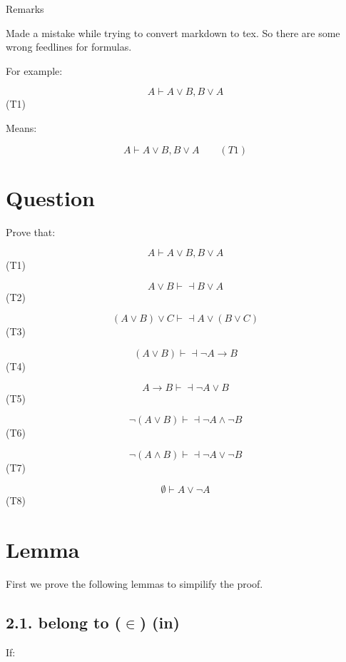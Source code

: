 \documentclass{article} %
\begin{document}
\par

\begin{Huge}
	\begin{center}
		Remarks
	\end{center}
\end{Huge}


Made a mistake while trying to convert markdown to tex. So there are some wrong feedlines for formulas.

For example:

\[A\vdash A \vee B, B \vee A \] (T1)

Means:

\[A\vdash A \vee B, B \vee A \quad \quad(T1)\] 

\newpage

\hypertarget{question}{%
\section{Question}\label{question}}

Prove that:

\[A\vdash A \vee B, B \vee A \] (T1)

\[A\vee B \vdash \dashv B \vee A\] (T2)

\[(A \vee B)\vee C \vdash \dashv A \vee (B \vee C)\] (T3)

\[(A \vee B) \vdash \dashv \neg A \rightarrow B\] (T4)

\[ A \rightarrow B \vdash \dashv \neg A \vee B\] (T5)

\[\neg (A \vee B) \vdash \dashv \neg A \wedge \neg B\] (T6)

\[\neg (A \wedge B) \vdash \dashv \neg A \vee \neg B\] (T7)

\[\emptyset \vdash A \vee \neg A\] (T8)

\hypertarget{lemma}{%
\section{Lemma}\label{lemma}}

First we prove the following lemmas to simpilify the proof.

\hypertarget{belong-to-in-in}{%
\subsection{\texorpdfstring{2.1. belong to (\(\in\))
(in)}{2.1. belong to (\textbackslash{}in) (in)}}\label{belong-to-in-in}}

If:
\end{document}
